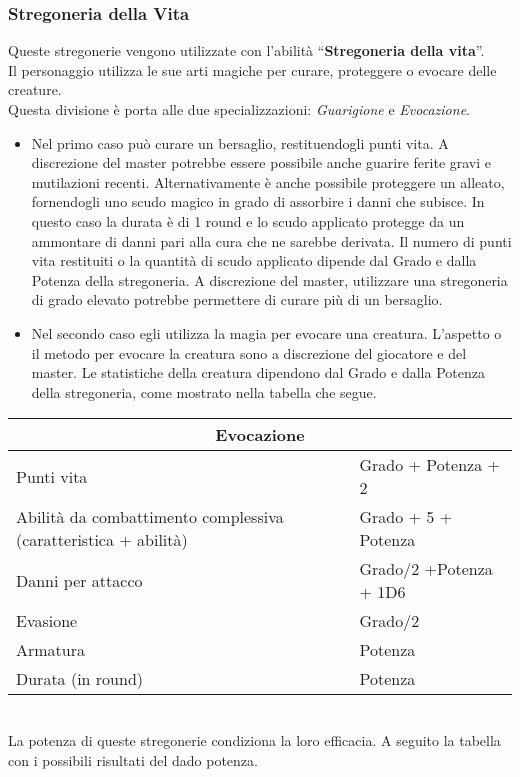 \documentclass[../manuale_main.tex]{subfiles}
\begin{document}
\subsubsection{Stregoneria della Vita}
Queste stregonerie vengono utilizzate con l'abilità ``\textbf{Stregoneria della vita}''.\\
Il personaggio utilizza le sue arti magiche per curare, proteggere o evocare delle creature. \\
Questa divisione è porta alle due specializzazioni: \emph{Guarigione} e \emph{Evocazione}.\\
\begin{itemize}
\item Nel primo caso può curare un bersaglio, restituendogli punti vita. A discrezione del master potrebbe essere possibile anche guarire ferite gravi e mutilazioni recenti. Alternativamente è anche possibile proteggere un alleato, fornendogli uno scudo magico in grado di assorbire i danni che subisce. In questo caso la durata è di 1 round e lo scudo applicato protegge da un ammontare di danni pari alla cura che ne sarebbe derivata. Il numero di punti vita restituiti o la quantità di scudo applicato dipende dal Grado e dalla Potenza della stregoneria. A discrezione del master, utilizzare una stregoneria di grado elevato potrebbe permettere di curare più di un bersaglio.
\item Nel secondo caso egli utilizza la magia per evocare una creatura. L'aspetto o il metodo per evocare la creatura sono a discrezione del giocatore e del master. Le statistiche della creatura dipendono dal Grado e dalla Potenza della stregoneria, come mostrato nella tabella che segue.
\end{itemize}

\begin{tabular}{| l | l |}
\hline
\multicolumn{2}{|c|}{\textbf{Evocazione}}\\
\hline
Punti vita&Grado + Potenza + 2\\
Abilità da combattimento complessiva (caratteristica + abilità)&Grado + 5 + Potenza\\
Danni per attacco&Grado/2 +Potenza + 1D6\\
Evasione&Grado/2 \\
Armatura&Potenza\\
Durata (in round)& Potenza\\
\hline
\end{tabular}\\

La potenza di queste stregonerie condiziona la loro efficacia. A seguito la tabella con i possibili risultati del dado potenza.\\
\end{document}
